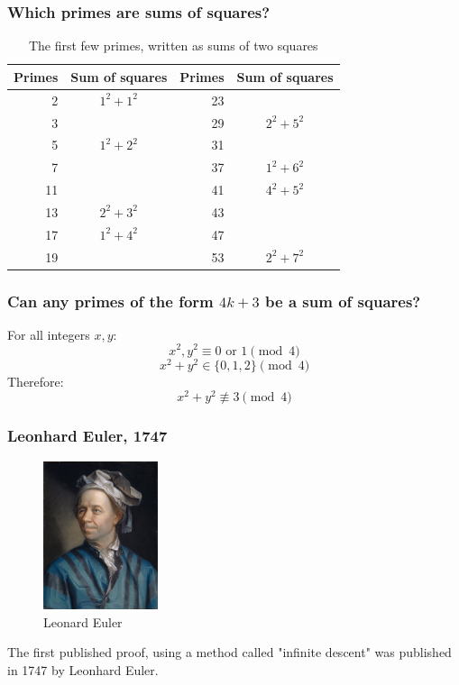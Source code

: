 \documentclass{beamer}
\begin{document}
\begin{frame}
	\frametitle{Which primes are sums of squares?}

	\begin{table}
\begin{tabular}{| r | c || r | c |}
	\hline 
	Primes & Sum of squares & Primes & Sum of squares \\
	\hline 
	2 & $1^2 + 1^2$ & 23 & \textcolor{red}{\textbf{\textemdash}} \\
	3 & \textcolor{red}{\textbf{\textemdash}} & 29 & $2^2 + 5^2$ \\
	5 & $1^2 + 2^2$ & 31 & \textcolor{red}{\textbf{\textemdash}} \\
	7 &  \textcolor{red}{\textbf{\textemdash}} & 37 & $1^2 + 6^2$ \\
	11 &  \textcolor{red}{\textbf{\textemdash}} & 41 & $4^2 + 5^2$ \\
	13 &  $2^2+3^2$ & 43 & \textcolor{red}{\textbf{\textemdash}} \\
	17 &  $1^2 + 4^2$ & 47 & \textcolor{red}{\textbf{\textemdash}} \\
	19 & \textcolor{red}{\textbf{\textemdash}} & 53 & $2^2 + 7^2$ \\
\hline
\end{tabular}
\caption*{The first few primes, written as sums of two squares}
\end{table}

\end{frame}

\begin{frame}
	\frametitle{Can any primes of the form $4k+3$ be a sum of squares?}

	For all integers $x,y$:
	\[ x^2, y^2 \equiv 0 \text{ or } 1 \pmod{4} \]
	\[ x^2 + y^2 \in \{0, 1, 2\} \pmod{4} \]
	Therefore:
	\[ x^2 + y^2 \not \equiv 3 \pmod{4} \]
\end{frame}


\begin{frame}
	\frametitle{Leonhard Euler, 1747}
	\begin{figure}
		\includegraphics[width=0.3\textwidth]{594px-Leonhard_Euler.jpg}
        	\caption*{Leonard Euler}
        	\label{fig:euler1}
	\end{figure}

	The first published proof, using a method called "infinite descent" was
	published in 1747 by Leonhard Euler.
\end{frame}
\end{document}
